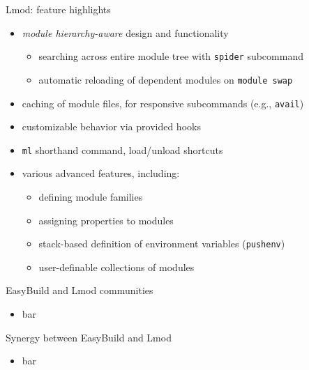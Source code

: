 \documentclass[10pt,xcolor={usenames,dvipsnames}]{beamer}
\begin{document}
\begin{frame}{Lmod: feature highlights}
    \begin{itemize}
        \item \emph{module hierarchy-aware} design and functionality
        \begin{itemize}
            \item searching across entire module tree with \texttt{spider} subcommand
            \item automatic reloading of dependent modules on \texttt{module swap}
        \end{itemize}
        \item caching of module files, for responsive subcommands (e.g., \texttt{avail})
        \item customizable behavior via provided hooks
        \item \texttt{ml} shorthand command, load/unload shortcuts
        \item various advanced features, including:
        \begin{itemize}
            \item defining module families
            \item assigning properties to modules
            \item stack-based definition of environment variables (\texttt{pushenv})
            \item user-definable collections of modules
        \end{itemize}
    \end{itemize}
\end{frame}


\begin{frame}{EasyBuild and Lmod communities}
\begin{itemize}
    \item bar
\end{itemize}
\end{frame}


\begin{frame}{Synergy between EasyBuild and Lmod}
\begin{itemize}
    \item bar
\end{itemize}
\end{frame}
\end{document}
